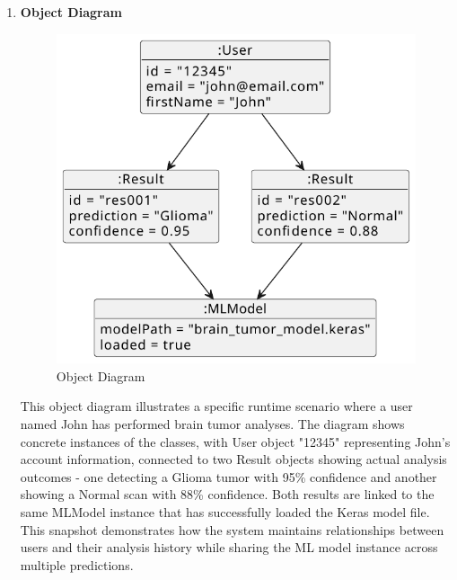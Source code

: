 \begin{enumerate}[label=\roman*.]



    \item \textbf{Object Diagram}
          \begin{center}
              \begin{figure}[H]
                  \centering
                  \includegraphics[width=0.60\linewidth]{Images/Highlevel/object.pdf}
                  \caption{Object Diagram}
                  \label{fig:ObjectDiagram}
              \end{figure}
          \end{center}
          This object diagram illustrates a specific runtime scenario where a user named John has performed brain tumor analyses. The diagram shows concrete instances of the classes, with User object "12345" representing John's account information, connected to two Result objects showing actual analysis outcomes - one detecting a Glioma tumor with 95\% confidence and another showing a Normal scan with 88\% confidence. Both results are linked to the same MLModel instance that has successfully loaded the Keras model file. This snapshot demonstrates how the system maintains relationships between users and their analysis history while sharing the ML model instance across multiple predictions.


\end{enumerate}
